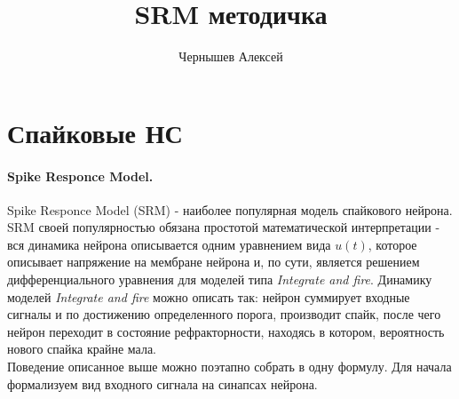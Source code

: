 \documentclass[a4paper,10pt]{article}
\title{SRM методичка}
\author{Чернышев Алексей}
\begin{document}
\section*{Спайковые НС}
\paragraph{Spike Responce Model.} Spike Responce Model (SRM) - наиболее популярная модель спайкового нейрона. SRM своей популярностью обязана простотой математической интерпретации - вся динамика нейрона описывается одним уравнением вида $u(t)$, которое описывает напряжение на мембране нейрона и, по сути, является решением дифференциального уравнения для моделей типа \textit{Integrate and fire}. Динамику моделей \textit{Integrate and fire} можно описать так: нейрон суммирует входные сигналы и по достижению определенного порога, производит спайк, после чего нейрон переходит в состояние рефракторности, находясь в котором, вероятность нового спайка крайне мала.\\
\indent Поведение описанное выше можно поэтапно собрать в одну формулу. Для начала формализуем вид входного сигнала на синапсах нейрона.
\end{document}
